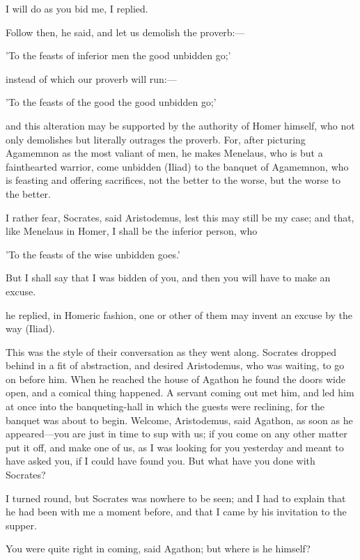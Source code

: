 \para[15] I will do as you bid me, I replied.

\para[16] Follow then, he said, and let us demolish the proverb:---

\para[17] 'To the feasts of inferior men the good unbidden go;'

\para[18] instead of which our proverb will run:---

\para[19] 'To the feasts of the good the good unbidden go;'

\para[20] and this alteration may be supported by the authority of Homer himself, who not only demolishes but literally outrages the proverb. For, after picturing Agamemnon as the most valiant of men, he makes Menelaus, who is but a fainthearted warrior, come unbidden (Iliad) to the banquet of Agamemnon, who is feasting and offering sacrifices, not the better to the worse, but the worse to the better.

\para[21] I rather fear, Socrates, said Aristodemus, lest this may still be my case; and that, like Menelaus in Homer, I shall be the inferior person, who

\para[22] 'To the feasts of the wise unbidden goes.'

\para[23] But I shall say that I was bidden of you, and then you will have to make an excuse.

\para[24] he replied, in Homeric fashion, one or other of them may invent an excuse by the way (Iliad).

\para[25] This was the style of their conversation as they went along. Socrates dropped behind in a fit of abstraction, and desired Aristodemus, who was waiting, to go on before him. When he reached the house of Agathon he found the doors wide open, and a comical thing happened. A servant coming out met him, and led him at once into the banqueting-hall in which the guests were reclining, for the banquet was about to begin. Welcome, Aristodemus, said Agathon, as soon as he appeared---you are just in time to sup with us; if you come on any other matter put it off, and make one of us, as I was looking for you yesterday and meant to have asked you, if I could have found you. But what have you done with Socrates?

\para[26] I turned round, but Socrates was nowhere to be seen; and I had to explain that he had been with me a moment before, and that I came by his invitation to the supper.

\para[27] You were quite right in coming, said Agathon; but where is he himself?

